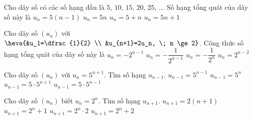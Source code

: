 \begin{ex}%
	Cho dãy số có các số hạng đầu là $5$, $10$, $15$, $20$, $25$,  $\ldots$ Số hạng tổng quát của dãy số này là
	 \choice
		{$u_n=5(n-1)$} 
		{\True  $u_n=5n$}
		 {$u_n=5+n$}
		{$u_n=5n+1$} 
\end{ex}

\begin{ex}%
	Cho dãy số $(u_n)$ với $\heva{&u_1=\dfrac{1}{2} \\ &u_{n+1}=2u_n, \; n \ge  2}$. Công thức số hạng tổng quát của dãy số này là
	\choice 
		 {$u_n=-2^{n-1}$}
		{$u_n=-\dfrac{1}{2^{n-1}}$} 
		{$u_n=-\dfrac{1}{2^n}$} 
		 {\True $u_n=2^{n-2}$}
\end{ex}

\begin{ex}%
	Cho dãy số $(u_n)$  với $u_n=5^{n+1}$. Tìm số hạng $u_{n-1}$.
	\choice 
		 {$u_{n-1}=5^{n-1}$}
		 {\True $u_{n-1}=5^n$}
		{$u_{n-1}=5  \cdot 5^{n+1}$}
		{$u_{n-1}=5 \cdot  5^{n-1}$}
\end{ex}

\begin{ex}%
	Cho  dãy số $(u_n)$ biết $u_n=2^n$. Tìm số hạng $u_{n+1}$.
	 \choice
		{$u_{n+1}=2(n+1)$} 
		 {$u_{n+1}=2^n+1$}
		{\True $u_{n+1}=2^n \cdot  2$}
		{$u_{n+1}=2^n+2$} 
\end{ex}

